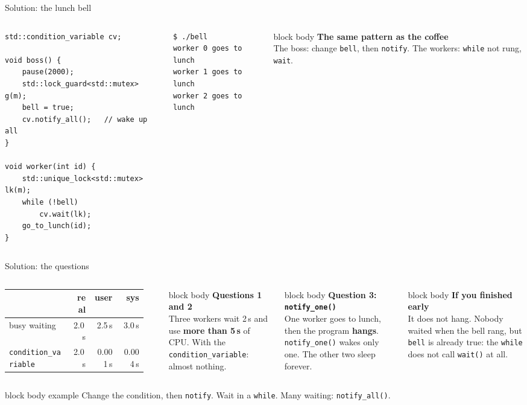 \documentclass[aspectratio=169,10pt]{beamer}
\newcommand{\stepbox}[2]{%
  \begin{beamercolorbox}[rounded=true,sep=0.09cm,wd=\linewidth]{block body}
    \footnotesize\textbf{#1}\\ #2
  \end{beamercolorbox}\vspace{0.06cm}}
\newcommand{\keymsg}[1]{%
  \begin{beamercolorbox}[rounded=true,sep=0.1cm,wd=\textwidth]{block body example}
    \centering\footnotesize #1
  \end{beamercolorbox}}
\begin{document}
\begin{frame}[fragile]{Solution: the lunch bell}
  \begin{columns}[T,onlytextwidth]
\begin{lstlisting}[style=cpp]
std::condition_variable cv;

void boss() {
    pause(2000);
    std::lock_guard<std::mutex> g(m);
    bell = true;
    cv.notify_all();   // wake up all
}

void worker(int id) {
    std::unique_lock<std::mutex> lk(m);
    while (!bell)
        cv.wait(lk);
    go_to_lunch(id);
}
\end{lstlisting}
\begin{lstlisting}[style=term]
$ ./bell
worker 0 goes to lunch
worker 1 goes to lunch
worker 2 goes to lunch
\end{lstlisting}
      \stepbox{The same pattern as the coffee}{The boss: change \texttt{bell}, then \texttt{notify}.
        The workers: \texttt{while} not rung, \texttt{wait}.}
  \end{columns}
\end{frame}

\begin{frame}{Solution: the questions}
  \begin{columns}[T,onlytextwidth]
      \centering\footnotesize
      \renewcommand{\arraystretch}{1.3}
      \begin{tabular}{l r r r}
        \toprule
         & \textbf{real} & \textbf{user} & \textbf{sys} \\
        \midrule
        busy waiting & 2.0\,s & 2.5\,s & 3.0\,s \\
        \texttt{condition\_variable} & 2.0\,s & 0.001\,s & 0.004\,s \\
        \bottomrule
      \end{tabular}\\[0.3cm]
      \raggedright
      \stepbox{Questions 1 and 2}{Three workers wait 2\,s and use \textbf{more than 5\,s} of CPU. With the
        \texttt{condition\_variable}: almost nothing.}
      \stepbox{Question 3: \texttt{notify\_one()}}{One worker goes to lunch, then the program \textbf{hangs}.
        \texttt{notify\_one()} wakes only one. The other two sleep forever.}
      \stepbox{If you finished early}{It does not hang. Nobody waited when the bell rang, but \texttt{bell} is already
        true: the \texttt{while} does not call \texttt{wait()} at all.}
  \end{columns}
  \vfill
  \keymsg{Change the condition, then \texttt{notify}. Wait in a \texttt{while}. Many waiting: \texttt{notify\_all()}.}
\end{frame}
\end{document}
